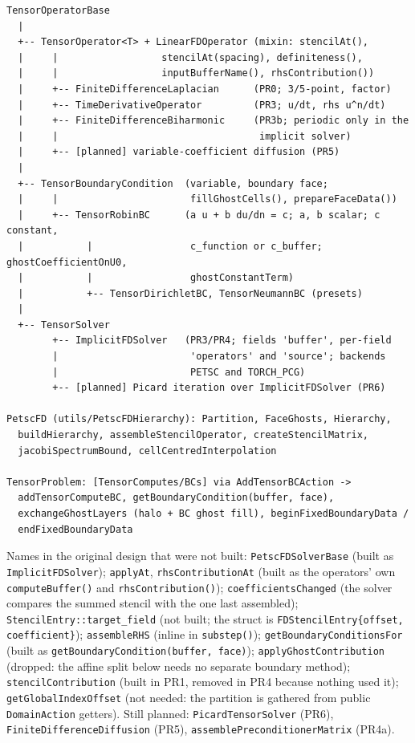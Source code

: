 \documentclass[11pt]{article}
\newenvironment{schematic}{%
  \begin{tcolorbox}[breakable, colback=codebg, colframe=gray!40, boxrule=0.4pt, arc=1mm, left=4mm, right=4mm, top=2mm, bottom=2mm]
  \ttfamily\footnotesize
}{%
  \end{tcolorbox}
}
\begin{document}
\begin{schematic}
\begin{verbatim}
TensorOperatorBase
  |
  +-- TensorOperator<T> + LinearFDOperator (mixin: stencilAt(),
  |     |                  stencilAt(spacing), definiteness(),
  |     |                  inputBufferName(), rhsContribution())
  |     +-- FiniteDifferenceLaplacian      (PR0; 3/5-point, factor)
  |     +-- TimeDerivativeOperator         (PR3; u/dt, rhs u^n/dt)
  |     +-- FiniteDifferenceBiharmonic     (PR3b; periodic only in the
  |     |                                   implicit solver)
  |     +-- [planned] variable-coefficient diffusion (PR5)
  |
  +-- TensorBoundaryCondition  (variable, boundary face;
  |     |                       fillGhostCells(), prepareFaceData())
  |     +-- TensorRobinBC      (a u + b du/dn = c; a, b scalar; c constant,
  |           |                 c_function or c_buffer; ghostCoefficientOnU0,
  |           |                 ghostConstantTerm)
  |           +-- TensorDirichletBC, TensorNeumannBC (presets)
  |
  +-- TensorSolver
        +-- ImplicitFDSolver   (PR3/PR4; fields 'buffer', per-field
        |                       'operators' and 'source'; backends
        |                       PETSC and TORCH_PCG)
        +-- [planned] Picard iteration over ImplicitFDSolver (PR6)

PetscFD (utils/PetscFDHierarchy): Partition, FaceGhosts, Hierarchy,
  buildHierarchy, assembleStencilOperator, createStencilMatrix,
  jacobiSpectrumBound, cellCentredInterpolation

TensorProblem: [TensorComputes/BCs] via AddTensorBCAction ->
  addTensorComputeBC, getBoundaryCondition(buffer, face),
  exchangeGhostLayers (halo + BC ghost fill), beginFixedBoundaryData /
  endFixedBoundaryData
\end{verbatim}
\end{schematic}

Names in the original design that were not built: \texttt{PetscFDSolverBase}
(built as \texttt{ImplicitFDSolver}); \texttt{applyAt},
\texttt{rhsContributionAt} (built as the operators' own
\texttt{computeBuffer()} and \texttt{rhsContribution()});
\texttt{coefficientsChanged} (the solver compares the summed stencil with the
one last assembled); \texttt{StencilEntry::target\_field} (not built; the
struct is \texttt{FDStencilEntry\{offset, coefficient\}});
\texttt{assembleRHS} (inline in \texttt{substep()});
\texttt{getBoundaryConditionsFor} (built as
\texttt{getBoundaryCondition(buffer, face)});
\texttt{applyGhostContribution} (dropped: the affine split below needs no
separate boundary method); \texttt{stencilContribution} (built in PR1,
removed in PR4 because nothing used it); \texttt{getGlobalIndexOffset}
(not needed: the partition is gathered from public \texttt{DomainAction}
getters). Still planned: \texttt{PicardTensorSolver} (PR6),
\texttt{FiniteDifferenceDiffusion} (PR5), \texttt{assemblePreconditionerMatrix}
(PR4a).
\end{document}
